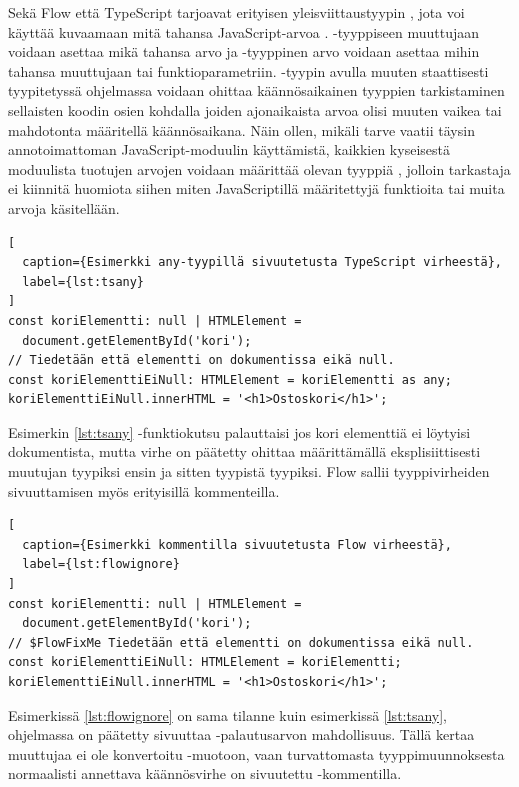 Sekä Flow että TypeScript tarjoavat erityisen
yleisviittaustyypin , jota voi käyttää kuvaamaan mitä tahansa
JavaScript-arvoa \cite{TypeScriptSpec}. -tyyppiseen muuttujaan voidaan asettaa mikä
tahansa arvo ja -tyyppinen arvo voidaan asettaa mihin tahansa muuttujaan
tai funktioparametriin. -tyypin avulla muuten staattisesti tyypitetyssä
ohjelmassa voidaan ohittaa käännösaikainen tyyppien tarkistaminen sellaisten
koodin osien kohdalla joiden ajonaikaista arvoa olisi muuten vaikea tai
mahdotonta määritellä käännösaikana. Näin ollen, mikäli tarve vaatii täysin
annotoimattoman JavaScript-moduulin käyttämistä, kaikkien kyseisestä moduulista
tuotujen arvojen voidaan määrittää olevan tyyppiä , jolloin tarkastaja ei
kiinnitä huomiota siihen miten JavaScriptillä määritettyjä funktioita tai
muita arvoja käsitellään.
\begin{lstlisting}[
  caption={Esimerkki any-tyypillä sivuutetusta TypeScript virheestä},
  label={lst:tsany}
]
const koriElementti: null | HTMLElement =
  document.getElementById('kori');
// Tiedetään että elementti on dokumentissa eikä null.
const koriElementtiEiNull: HTMLElement = koriElementti as any;
koriElementtiEiNull.innerHTML = '<h1>Ostoskori</h1>';
\end{lstlisting}
Esimerkin \ref{lst:tsany} -funktiokutsu
palauttaisi  jos kori elementtiä ei löytyisi dokumentista,
mutta virhe on päätetty ohittaa määrittämällä eksplisiittisesti
muutujan tyypiksi ensin  ja sitten  tyypistä
 tyypiksi. Flow sallii tyyppivirheiden sivuuttamisen
myös erityisillä kommenteilla.
\begin{lstlisting}[
  caption={Esimerkki kommentilla sivuutetusta Flow virheestä},
  label={lst:flowignore}
]
const koriElementti: null | HTMLElement =
  document.getElementById('kori');
// $FlowFixMe Tiedetään että elementti on dokumentissa eikä null.
const koriElementtiEiNull: HTMLElement = koriElementti;
koriElementtiEiNull.innerHTML = '<h1>Ostoskori</h1>';
\end{lstlisting}
Esimerkissä \ref{lst:flowignore} on sama tilanne kuin esimerkissä \ref{lst:tsany},
ohjelmassa on päätetty sivuuttaa -palautusarvon mahdollisuus.
Tällä kertaa muuttujaa ei ole konvertoitu -muotoon, vaan
turvattomasta tyyppimuunnoksesta normaalisti annettava käännösvirhe on
sivuutettu -kommentilla.
